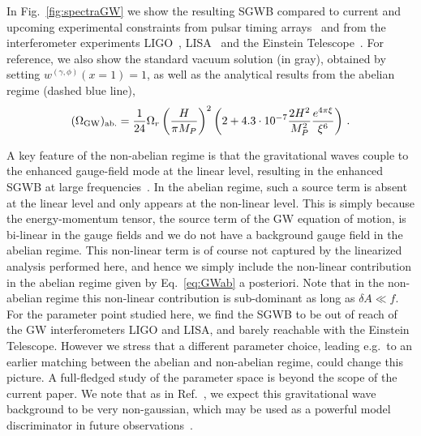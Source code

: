 In Fig.~\ref{fig:spectraGW} we show the resulting  SGWB compared to current and upcoming experimental constraints from pulsar timing arrays~\cite{vanHaasteren:2011ni,Kramer:2004rwa} and from the interferometer experiments LIGO~\cite{TheLIGOScientific:2016wyq}, LISA~\cite{Audley:2017drz} and the Einstein Telescope~\cite{ET}. For reference, we also show the standard vacuum solution (in gray), obtained by setting $  w^{(\gamma, \phi)}(x = 1) = 1$, as well as the analytical results from the abelian regime (dashed blue line),
\begin{align}
 (\Omega_{\rm GW})_\text{ab.}  = \frac{1}{24} \Omega_r \left( \frac{H}{\pi M_P} \right)^2 \left( 2 + 4.3 \cdot 10^{-7} \frac{2 H^2}{M_P^2} \frac{e^{4 \pi \xi}}{\xi^6}\right) \,.
 \label{eq:GWab}
\end{align}
 {A key feature of the non-abelian regime is that the gravitational waves couple to the enhanced gauge-field mode at the linear level, resulting in the enhanced SGWB at large frequencies~\cite{Adshead:2013nka}. In the abelian regime, such a source term is absent at the linear level and only appears at the non-linear level. This is simply because the energy-momentum tensor, the source term of the GW equation of motion, is bi-linear in the gauge fields and we do not have a background gauge field in the abelian regime. This non-linear term is of course not captured by the linearized analysis performed here, and hence we simply include the non-linear contribution in the abelian regime given by Eq.~\eqref{eq:GWab} a posteriori. Note that in the non-abelian regime this non-linear contribution is sub-dominant as long as $\delta A \ll f$. For the parameter point studied here, we find the SGWB to be out of reach of the GW interferometers LIGO and LISA, and barely reachable with the Einstein Telescope. However we stress that a different parameter choice, leading e.g.\ to an earlier matching between the abelian and non-abelian regime, could change this picture. A full-fledged study of the parameter space is beyond the scope of the current paper. We note that as in Ref.~\cite{Agrawal:2017awz}, we expect this gravitational wave background to be very non-gaussian, which may be used as a powerful model discriminator in future observations~\cite{Bartolo:2018qqn}.



}
